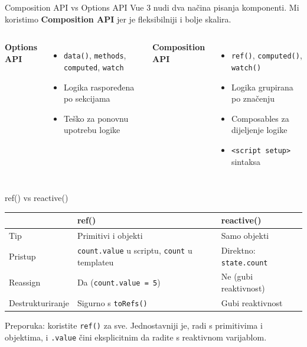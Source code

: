 \begin{frame}{Composition API vs Options API}
Vue 3 nudi dva načina pisanja komponenti. Mi koristimo \textbf{Composition API} jer je fleksibilniji i bolje skalira.

\vspace{0.4em}
\begin{columns}[T]
\textbf{Options API}
\begin{itemize}
  \item \texttt{data()}, \texttt{methods}, \texttt{computed}, \texttt{watch}
  \item Logika raspoređena po sekcijama
  \item Teško za ponovnu upotrebu logike
\end{itemize}

\textbf{Composition API}
\begin{itemize}
  \item \texttt{ref()}, \texttt{computed()}, \texttt{watch()}
  \item Logika grupirana po značenju
  \item Composables za dijeljenje logike
  \item \texttt{<script setup>} sintaksa
\end{itemize}
\end{columns}
\end{frame}

\begin{frame}{ref() vs reactive()}
\begin{tabular}{@{}lp{5cm}p{5cm}@{}}
  \toprule
  & \textbf{ref()} & \textbf{reactive()} \\
  \midrule
  Tip & Primitivi i objekti & Samo objekti \\
  Pristup & \texttt{count.value} u scriptu, \texttt{count} u templateu & Direktno: \texttt{state.count} \\
  Reassign & Da (\texttt{count.value = 5}) & Ne (gubi reaktivnost) \\
  Destrukturiranje & Sigurno s \texttt{toRefs()} & Gubi reaktivnost \\
  \bottomrule
\end{tabular}

\vspace{0.6em}
Preporuka: koristite \texttt{ref()} za sve. Jednostavniji je, radi s primitivima i objektima, i \texttt{.value} čini eksplicitnim da radite s reaktivnom varijablom.
\end{frame}

